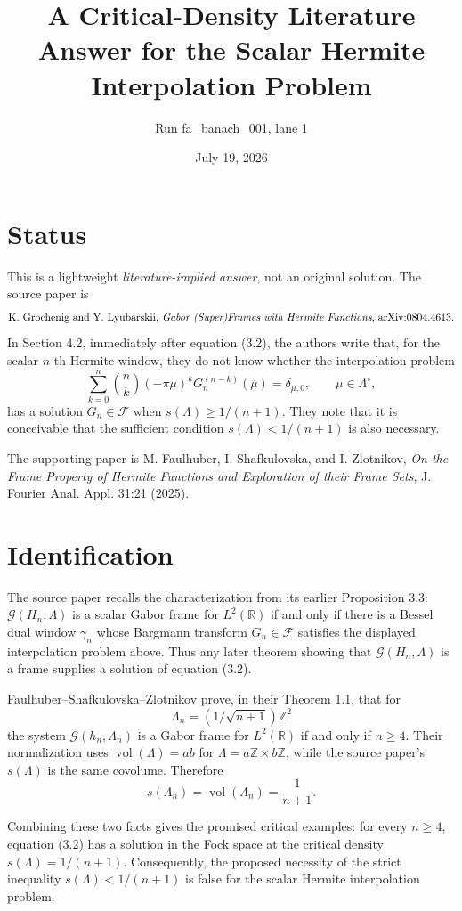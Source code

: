 \documentclass[11pt]{article}
\title{A Critical-Density Literature Answer for the Scalar Hermite Interpolation Problem}
\author{Run fa\_banach\_001, lane 1}
\date{July 19, 2026}
\newcommand{\R}{\mathbb R}
\newcommand{\Z}{\mathbb Z}
\newcommand{\cG}{\mathcal G}
\newcommand{\cF}{\mathcal F}
\begin{document}
\maketitle

\section{Status}

This is a lightweight \emph{literature-implied answer}, not an original
solution.  The source paper is
\[
\text{K. Grochenig and Y. Lyubarskii, \emph{Gabor (Super)Frames with Hermite Functions},
arXiv:0804.4613.}
\]
In Section 4.2, immediately after equation (3.2), the authors write that, for
the scalar \(n\)-th Hermite window, they do not know whether the interpolation
problem
\[
  \sum_{k=0}^n \binom{n}{k}(-\pi \mu)^k
  G_n^{(n-k)}(\overline{\mu})=\delta_{\mu,0},
  \qquad \mu\in\Lambda^\circ,
\]
has a solution \(G_n\in\cF\) when \(s(\Lambda)\ge 1/(n+1)\).  They note that it
is conceivable that the sufficient condition \(s(\Lambda)<1/(n+1)\) is also
necessary.

The supporting paper is M. Faulhuber, I. Shafkulovska, and I. Zlotnikov,
\emph{On the Frame Property of Hermite Functions and Exploration of their Frame
Sets}, J. Fourier Anal. Appl. 31:21 (2025).

\section{Identification}

The source paper recalls the characterization from its earlier Proposition 3.3:
\(\cG(H_n,\Lambda)\) is a scalar Gabor frame for \(L^2(\R)\) if and only if
there is a Bessel dual window \(\gamma_n\) whose Bargmann transform \(G_n\in\cF\)
satisfies the displayed interpolation problem above.  Thus any later theorem
showing that \(\cG(H_n,\Lambda)\) is a frame supplies a solution of equation
(3.2).

Faulhuber--Shafkulovska--Zlotnikov prove, in their Theorem 1.1, that for
\[
  \Lambda_n=(1/\sqrt{n+1})\Z^2
\]
the system \(\cG(h_n,\Lambda_n)\) is a Gabor frame for \(L^2(\R)\) if and only
if \(n\ge4\).  Their normalization uses \(\operatorname{vol}(\Lambda)=ab\) for
\(\Lambda=a\Z\times b\Z\), while the source paper's \(s(\Lambda)\) is the same
covolume.  Therefore
\[
  s(\Lambda_n)=\operatorname{vol}(\Lambda_n)=\frac{1}{n+1}.
\]

Combining these two facts gives the promised critical examples: for every
\(n\ge4\), equation (3.2) has a solution in the Fock space at the critical
density \(s(\Lambda)=1/(n+1)\).  Consequently, the proposed necessity of the
strict inequality \(s(\Lambda)<1/(n+1)\) is false for the scalar Hermite
interpolation problem.
\end{document}
